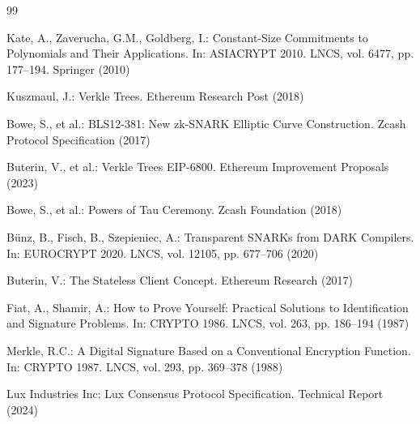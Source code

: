 
\begin{thebibliography}{99}

Kate, A., Zaverucha, G.M., Goldberg, I.: Constant-Size Commitments to Polynomials and Their Applications. In: ASIACRYPT 2010. LNCS, vol. 6477, pp. 177–194. Springer (2010)

Kuszmaul, J.: Verkle Trees. Ethereum Research Post (2018)

Bowe, S., et al.: BLS12-381: New zk-SNARK Elliptic Curve Construction. Zcash Protocol Specification (2017)

Buterin, V., et al.: Verkle Trees EIP-6800. Ethereum Improvement Proposals (2023)

Bowe, S., et al.: Powers of Tau Ceremony. Zcash Foundation (2018)

Bünz, B., Fisch, B., Szepieniec, A.: Transparent SNARKs from DARK Compilers. In: EUROCRYPT 2020. LNCS, vol. 12105, pp. 677–706 (2020)

Buterin, V.: The Stateless Client Concept. Ethereum Research (2017)

Fiat, A., Shamir, A.: How to Prove Yourself: Practical Solutions to Identification and Signature Problems. In: CRYPTO 1986. LNCS, vol. 263, pp. 186–194 (1987)

Merkle, R.C.: A Digital Signature Based on a Conventional Encryption Function. In: CRYPTO 1987. LNCS, vol. 293, pp. 369–378 (1988)

Lux Industries Inc: Lux Consensus Protocol Specification. Technical Report (2024)

\end{thebibliography}

